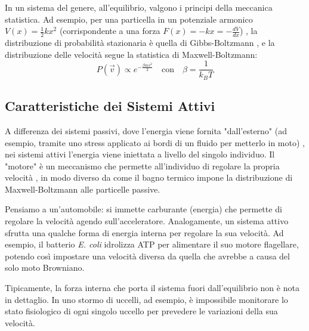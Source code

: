 In un sistema del genere, all'equilibrio, valgono i principi della meccanica statistica. Ad esempio, per una particella in un potenziale armonico $V(x) = \frac{1}{2}kx^2$ (corrispondente a una forza $F(x) = -kx = -\frac{dV}{dx}$) , la distribuzione di probabilità stazionaria è quella di Gibbs-Boltzmann , e la distribuzione delle velocità segue la statistica di Maxwell-Boltzmann:
\begin{equation}
    P(\vec{v}) \propto e^{-\frac{\beta m v^2}{2}} \quad \text{con} \quad \beta = \frac{1}{k_B T}
\end{equation}

\subsection{Caratteristiche dei Sistemi Attivi}
A differenza dei sistemi passivi, dove l'energia viene fornita "dall'esterno" (ad esempio, tramite uno stress applicato ai bordi di un fluido per metterlo in moto) , nei sistemi attivi l'energia viene iniettata a livello del singolo individuo. Il "motore" è un meccanismo che permette all'individuo di regolare la propria velocità , in modo diverso da come il bagno termico impone la distribuzione di Maxwell-Boltzmann alle particelle passive.

Pensiamo a un'automobile: si immette carburante (energia) che permette di regolare la velocità agendo sull'acceleratore. Analogamente, un sistema attivo sfrutta una qualche forma di energia interna per regolare la sua velocità. Ad esempio, il batterio \textit{E. coli} idrolizza ATP per alimentare il suo motore flagellare, potendo così impostare una velocità diversa da quella che avrebbe a causa del solo moto Browniano.

Tipicamente, la forza interna che porta il sistema fuori dall'equilibrio non è nota in dettaglio. In uno stormo di uccelli, ad esempio, è impossibile monitorare lo stato fisiologico di ogni singolo uccello per prevedere le variazioni della sua velocità.

